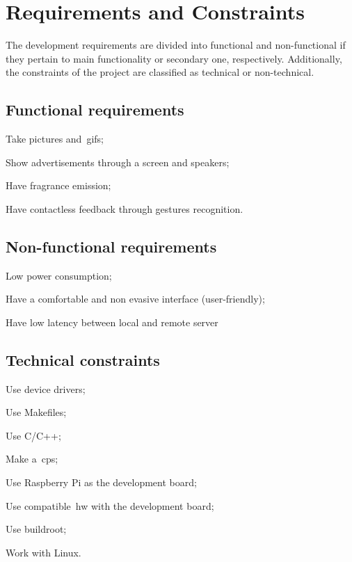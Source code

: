 \section{Requirements and Constraints}
\label{sec:req-const}

The development requirements are divided into functional and non-functional if they pertain to main functionality or secondary one, respectively. Additionally, the constraints of the project are classified as technical or non-technical.

\subsection{Functional requirements}
\label{sec:funct-requ}

\begin{item-c}
\item Take pictures and~\gls{gif}s;
\item Show advertisements through a screen and speakers;
\item Have fragrance emission;
\item Have contactless feedback through gestures recognition.
\end{item-c}
\subsection{Non-functional requirements}
\label{sec:non-funct-requ}

\begin{item-c}
\item Low power consumption;
\item Have a comfortable and non evasive interface (user-friendly);
\item Have low latency between local and remote server
\end{item-c}
\subsection{Technical constraints}
\label{sec:techn-constr}

\begin{item-c}
\item Use device drivers;
\item Use Makefiles;
\item Use C/C++;
\item Make a~\gls{cps};
\item Use Raspberry Pi as the development board;
\item Use compatible~\gls{hw} with the development board;
\item Use buildroot;
\item Work with Linux.
\end{item-c}
